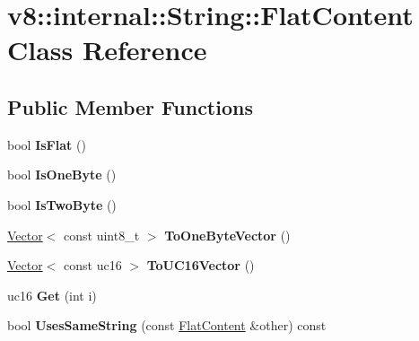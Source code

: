 \hypertarget{classv8_1_1internal_1_1_string_1_1_flat_content}{}\section{v8\+:\+:internal\+:\+:String\+:\+:Flat\+Content Class Reference}
\label{classv8_1_1internal_1_1_string_1_1_flat_content}
\subsection*{Public Member Functions}
\begin{DoxyCompactItemize}
\item 
bool {\bfseries Is\+Flat} ()\hypertarget{classv8_1_1internal_1_1_string_1_1_flat_content_a75210c93d9fcaeaa1a8862d34feef81d}{}\label{classv8_1_1internal_1_1_string_1_1_flat_content_a75210c93d9fcaeaa1a8862d34feef81d}

\item 
bool {\bfseries Is\+One\+Byte} ()\hypertarget{classv8_1_1internal_1_1_string_1_1_flat_content_a7db2dcbf765cc9709c157aa213f78045}{}\label{classv8_1_1internal_1_1_string_1_1_flat_content_a7db2dcbf765cc9709c157aa213f78045}

\item 
bool {\bfseries Is\+Two\+Byte} ()\hypertarget{classv8_1_1internal_1_1_string_1_1_flat_content_aca97c9ba0b87f12920bce7d70dc533a3}{}\label{classv8_1_1internal_1_1_string_1_1_flat_content_aca97c9ba0b87f12920bce7d70dc533a3}

\item 
\hyperlink{classv8_1_1internal_1_1_vector}{Vector}$<$ const uint8\+\_\+t $>$ {\bfseries To\+One\+Byte\+Vector} ()\hypertarget{classv8_1_1internal_1_1_string_1_1_flat_content_a8d691831fa6f981faf9d370cc127ebd9}{}\label{classv8_1_1internal_1_1_string_1_1_flat_content_a8d691831fa6f981faf9d370cc127ebd9}

\item 
\hyperlink{classv8_1_1internal_1_1_vector}{Vector}$<$ const uc16 $>$ {\bfseries To\+U\+C16\+Vector} ()\hypertarget{classv8_1_1internal_1_1_string_1_1_flat_content_ab3025edb4da7c559232dc5541fc209c5}{}\label{classv8_1_1internal_1_1_string_1_1_flat_content_ab3025edb4da7c559232dc5541fc209c5}

\item 
uc16 {\bfseries Get} (int i)\hypertarget{classv8_1_1internal_1_1_string_1_1_flat_content_aa97ac376bf03bb3e0ceac041bf29ef61}{}\label{classv8_1_1internal_1_1_string_1_1_flat_content_aa97ac376bf03bb3e0ceac041bf29ef61}

\item 
bool {\bfseries Uses\+Same\+String} (const \hyperlink{classv8_1_1internal_1_1_string_1_1_flat_content}{Flat\+Content} \&other) const \hypertarget{classv8_1_1internal_1_1_string_1_1_flat_content_ad5fbfb80d383d18c526b63f8832ccabf}{}\label{classv8_1_1internal_1_1_string_1_1_flat_content_ad5fbfb80d383d18c526b63f8832ccabf}

\end{DoxyCompactItemize}
